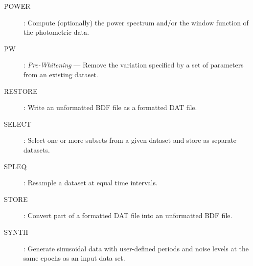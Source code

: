 \begin{description}
\item [POWER]: Compute (optionally) the power spectrum and/or the window
function of the photometric data.
\item [PW]: {\em Pre-Whitening} --- Remove the variation specified by a set of
parameters from an existing dataset.
\item [RESTORE]: Write an unformatted BDF file as a formatted DAT file.
\item [SELECT]: Select one or more subsets from a given dataset and store as
separate datasets.
\item [SPLEQ]: Resample a dataset at equal time intervals.
\item [STORE]: Convert part of a formatted DAT file into an unformatted BDF
file.
\item [SYNTH]: Generate sinusoidal data with user-defined periods and noise
levels at the same epochs as an input data set.
\end{description}
